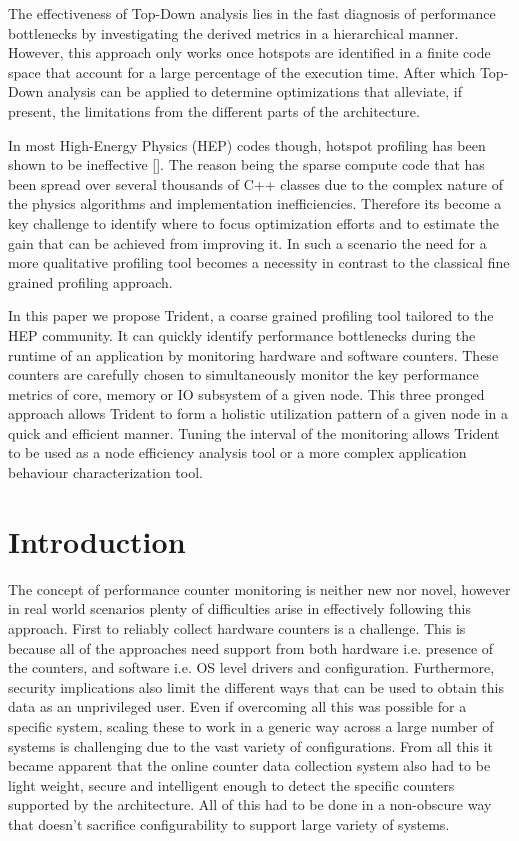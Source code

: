 \documentclass{webofc}
\begin{document}
The effectiveness of Top-Down analysis lies in the fast diagnosis of performance bottlenecks by investigating the derived metrics in a hierarchical manner. However, this approach only works once hotspots are identified in a finite code space that account for a large percentage of the execution time. After which Top-Down analysis can be applied to determine optimizations that alleviate, if present, the limitations from the different parts of the architecture. 

In most High-Energy Physics (HEP) codes though, hotspot profiling has been shown to be ineffective []. The reason being the sparse compute code that has been spread over several thousands of C++ classes due to the complex nature of the physics algorithms and implementation inefficiencies. Therefore its become a key challenge to identify where to focus optimization efforts and to estimate the gain that can be achieved from improving it. In such a scenario the need for a more qualitative profiling tool becomes a necessity in contrast to the classical fine grained profiling approach.

In this paper we propose Trident, a coarse grained profiling tool tailored to the HEP community. It can quickly identify performance bottlenecks during the runtime of an application by monitoring hardware and software counters. These counters are carefully chosen to simultaneously monitor the key performance metrics of core, memory or IO subsystem of a given node. This three pronged approach allows Trident to form a holistic utilization pattern of a given node in a quick and efficient manner. Tuning the interval of the monitoring allows Trident to be used as a node efficiency analysis tool or a more complex application behaviour characterization tool.

\section{Introduction}
\label{sec:intro}

The concept of performance counter monitoring is neither new nor novel, however in real world scenarios plenty of difficulties arise in effectively following this approach. First to reliably collect hardware counters is a challenge. This is because all of the approaches need support from both hardware i.e. presence of the counters, and software i.e. OS level drivers and configuration. Furthermore, security implications also limit the different ways that can be used to obtain this data as an unprivileged user. Even if overcoming all this was possible for a specific system, scaling these to work in a generic way across a large number of systems is challenging due to the vast variety of configurations. From all this it became apparent that the online counter data collection system also had to be light weight, secure and intelligent enough to detect the specific counters supported by the architecture. All of this had to be done in a non-obscure way that doesn't sacrifice configurability to support large variety of systems.
\end{document}
